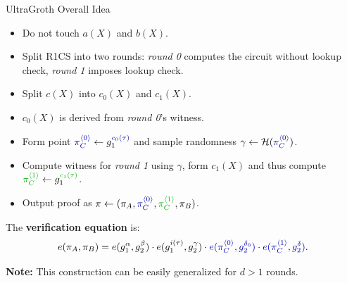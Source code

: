 \documentclass{zkdl-presentation-template}
\begin{document}
\begin{frame}{UltraGroth Overall Idea}
    \begin{itemize}
        \item Do not touch $a(X)$ and $b(X)$.\pause
        \item Split R1CS into two rounds:
        \textcolor{blue!70!black}{\textit{round 0}} computes the circuit without
        lookup check, \textcolor{green!70!black}{\textit{round 1}} imposes
        lookup check.\pause
        \item Split $c(X)$ into \textcolor{blue!70!black}{$c_0(X)$} and
        \textcolor{green!70!black}{$c_1(X)$}. \pause
        \item $c_0(X)$ is derived from \textcolor{blue!70!black}{\textit{round
        0}}'s witness. \pause
        \item Form point $\textcolor{blue!70!black}{\pi_C^{\langle 0 \rangle}}
        \gets
        g_1^{\textcolor{blue!70!black}{\textcolor{blue!70!black}{c_0(\tau)}}}$
        and sample randomness $\gamma \gets
        \mathcal{H}(\textcolor{blue!70!black}{\pi_C^{\langle 0 \rangle}})$.\pause
        \item Compute witness for \textcolor{green!70!black}{\textit{round 1}} using $\gamma$,
        form \textcolor{green!70!black}{$c_1(X)$} and thus compute
        $\textcolor{green!70!black}{\pi_C^{\langle 1 \rangle}} \gets
        g_1^{\textcolor{green!70!black}{c_1(\tau)}}$.\pause
        \item Output proof as $\pi \gets (\pi_A, \textcolor{blue!70!black}{\pi_C^{\langle
        0 \rangle}}, \textcolor{green!70!black}{\pi_C^{\langle 1 \rangle}}, \pi_B)$.\pause
    \end{itemize}

    The \textbf{verification equation} is:
    \begin{equation*}
        e(\pi_A,\pi_B) = e(g_1^{\alpha},g_2^{\beta})\cdot e(g_1^{i(\tau)},g_2^{\gamma})\cdot \textcolor{blue!70!black}{e(\pi_C^{\langle 0 \rangle},g_2^{\delta_0}) \cdot e(\pi_C^{\langle 1 \rangle},g_2^{\delta})}.
    \end{equation*}

    \pause\textbf{Note:} This construction can be easily generalized for $d>1$ rounds.
\end{frame}
\end{document}
